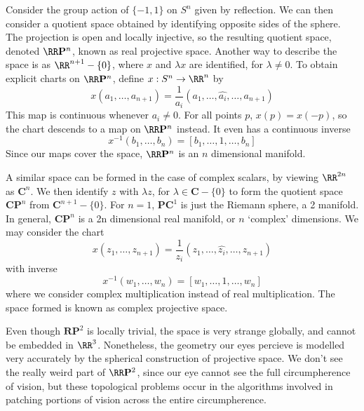\begin{example}
    Consider the group action of $\{ -1, 1 \}$ on $S^n$ given by reflection. We can then consider a quotient space obtained by identifying opposite sides of the sphere. The projection is open and locally injective, so the resulting quotient space, denoted $\RR \mathbf{P}^n$, known as real projective space. Another way to describe the space is as $\RR^{n+1} - \{ 0 \}$, where $x$ and $\lambda x$ are identified, for $\lambda \neq 0$. To obtain explicit charts on $\RR \mathbf{P}^n$, define $x: S^n \to \RR^n$ by
    \[ x(a_1, \dots, a_{n+1}) = \frac{1}{a_i} (a_1, \dots, \widehat{a_i}, \dots, a_{n+1}) \]
    This map is continuous whenever $a_i \neq 0$. For all points $p$, $x(p) = x(-p)$, so the chart descends to a map on $\RR \mathbf{P}^n$ instead. It even has a continuous inverse
    \[ x^{-1}(b_1, \dots, b_n) = \left[ b_1, \dots, 1, \dots, b_n \right] \]
    Since our maps cover the space, $\RR \mathbf{P}^n$ is an $n$ dimensional manifold.
\end{example}

\begin{example}
    A similar space can be formed in the case of complex scalars, by viewing $\RR^{2n}$ as $\mathbf{C}^n$. We then identify $z$ with $\lambda z$, for $\lambda \in \mathbf{C} - \{ 0 \}$ to form the quotient space $\mathbf{CP}^n$ from $\mathbf{C}^{n+1} - \{ 0 \}$. For $n = 1$, $\mathbf{P} \mathbf{C}^1$ is just the Riemann sphere, a 2 manifold. In general, $\mathbf{CP}^n$ is a 2n dimensional real manifold, or $n$ `complex' dimensions. We may consider the chart
    \[ x(z_1, \dots, z_{n+1}) = \frac{1}{z_i} (z_1, \dots, \widehat{z_i}, \dots, z_{n+1}) \]
    with inverse
    \[ x^{-1}(w_1, \dots, w_n) = [w_1, \dots, 1, \dots, w_n] \]
    where we consider complex multiplication instead of real multiplication. The space formed is known as complex projective space.
\end{example}

Even though $\mathbf{RP}^2$ is locally trivial, the space is very strange globally, and cannot be embedded in $\RR^3$. Nonetheless, the geometry our eyes percieve is modelled very accurately by the spherical construction of projective space. We don't see the really weird part of $\RR \mathbf{P}^2$, since our eye cannot see the full circumpherence of vision, but these topological problems occur in the algorithms involved in patching portions of vision across the entire circumpherence.

